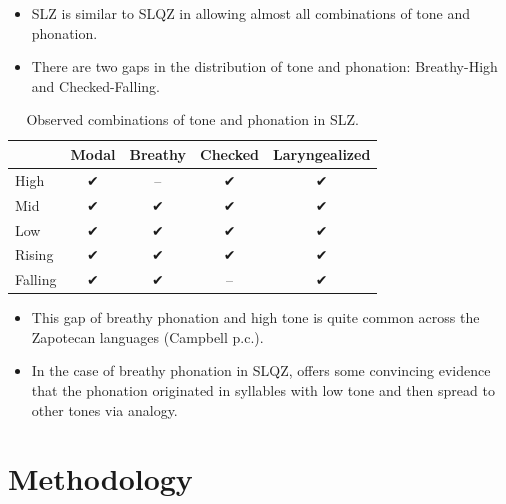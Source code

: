 \documentclass[12pt, letterpaper]{article}
\providecommand{\lsptoprule}{\midrule\toprule}
\providecommand{\lspbottomrule}{\bottomrule\midrule}
\begin{document}
\begin{itemize}
	\item SLZ is similar to SLQZ in allowing almost all combinations of tone and phonation. 
	\item There are two gaps in the distribution of tone and phonation: Breathy-High and Checked-Falling. 
\end{itemize}

\begin{table}[!h]
	\caption{Observed combinations of tone and phonation in SLZ.}
	\label{tab:ToneVoiceQuality}
	\centering

	\begin{tabular}{lcccc}
	\lsptoprule
		& \textbf{Modal} & \textbf{Breathy} & \textbf{Checked} & \textbf{Laryngealized} \\
	\hline
	High		& ✔︎ & -- & ✔︎ & ✔︎ \\
	Mid			& ✔︎ & ✔︎  & ✔︎ & ✔︎ \\
	Low			& ✔︎ & ✔︎  & ✔︎ & ✔︎ \\
	Rising		& ✔︎ & ✔︎  & ✔︎ & ✔︎ \\
	Falling		& ✔︎ & ✔︎  & --	& ✔︎ \\
	\lspbottomrule
	\end{tabular}
\end{table}

\begin{itemize}
	\item This gap of breathy phonation and high tone is quite common across the Zapotecan languages (Campbell p.c.). 
	\item In the case of breathy phonation in SLQZ, \citet{uchiharaToneRegistrogenesisQuiavini2016} offers some convincing evidence that the phonation originated in syllables with low tone and then spread to other tones via analogy.
\end{itemize}

\section{Methodology} \label{sec:Methods}
\end{document}
